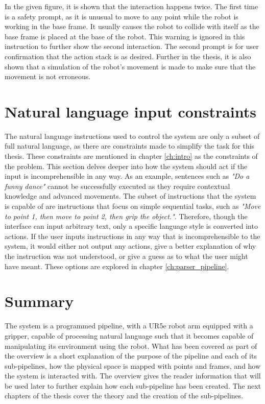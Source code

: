 In the given figure, it is shown that the interaction happens twice. The first time is a safety prompt, as it is unusual to move to any point while the robot is working in the base frame. It usually causes the robot to collide with itself as the base frame is placed at the base of the robot. This warning is ignored in this instruction to further show the second interaction. The second prompt is for user confirmation that the action stack is as desired. Further in the thesis, it is also shown that a simulation of the robot's movement is made to make sure that the movement is not erroneous.

\section{Natural language input constraints}
The natural language instructions used to control the system are only a subset of full natural language, as there are constraints made to simplify the task for this thesis. These constraints are mentioned in chapter \ref{ch:intro} as the constraints of the problem. This section delves deeper into how the system should act if the input is incomprehensible in any way. As an example, sentences such as \textit{"Do a funny dance"} cannot be successfully executed as they require contextual knowledge and advanced movements. The subset of instructions that the system is capable of are instructions that focus on simple sequential tasks, such as \textit{"Move to point 1, then move to point 2, then grip the object."}.
Therefore, though the interface can input arbitrary text, only a specific language style is converted into actions. If the user inputs instructions in any way that is incomprehensible to the system, it would either not output any actions, give a better explanation of why the instruction was not understood, or give a guess as to what the user might have meant. These options are explored in chapter \ref{ch:parser_pipeline}.

\section{Summary}
The system is a programmed pipeline, with a UR5e robot arm equipped with a gripper, capable of processing natural language such that it becomes capable of manipulating its environment using the robot. What has been covered as part of the overview is a short explanation of the purpose of the pipeline and each of its sub-pipelines, how the physical space is mapped with points and frames, and how the system is interacted with. The overview gives the reader information that will be used later to further explain how each sub-pipeline has been created. The next chapters of the thesis cover the theory and the creation of the sub-pipelines. 